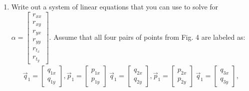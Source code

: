 \documentclass[11pt]{article}
\begin{document}
\begin{enumerate}
\begin{enumerate}
            \item Write out a system of linear equations that you can use to solve for $\alpha = \begin{bmatrix}
                                    r_{xx} \\
                                    r_{xy} \\
                                    r_{yx} \\
                                    r_{yy} \\
                                    r_{t_x} \\
                                    r_{t_y}
                                \end{bmatrix}
                    $. Assume that all four pairs of points from Fig. 4 are labeled as:
                    \[
                        \begin{aligned}
                            \vec q_1 = \begin{bmatrix}
                                            q_{1x} \\
                                            q_{1y}
                                       \end{bmatrix},
                            \vec p_1 = \begin{bmatrix}
                                            p_{1x} \\
                                            p_{1y}
                                       \end{bmatrix} \
                            \vec q_1 = \begin{bmatrix}
                                            q_{2x} \\
                                            q_{2y}
                                       \end{bmatrix},
                              \vec p_1 = \begin{bmatrix}
                                            p_{2x} \\
                                            p_{2y}
                                       \end{bmatrix} \
                              \vec q_1 = \begin{bmatrix}
                                            q_{3x} \\
                                            q_{3y}
                                       \end{bmatrix},

\end{aligned}\]
\end{enumerate}
\end{enumerate}
\end{document}
